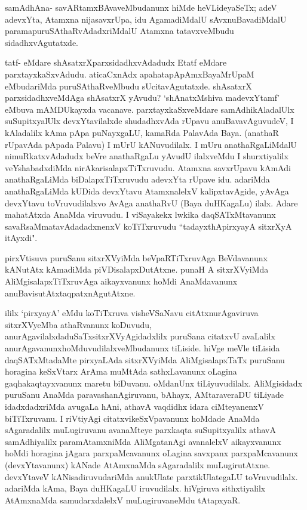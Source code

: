 \begin{artha}
samAdhAna- savARtamxBAvaveMbudanunx hiMde heVLideyaSeTx; adeV adevxYta, Atamxna nijasavxrUpa, idu AgamadiMdalU sAvxnuBavadiMdalU paramapuruSAthaRvAdadxriMdalU Atamxna tatavxveMbudu sidadhxvAgutatxde. 
\end{artha}


\begin{artha}
tatf- eMdare shAsatxrXparxsidadhxvAdadudx Etatf eMdare parxtayxkaSxvAdudu. aticaCxnAdx apahatapApAmx\s BayaMrUpaM eMbudariMda puruSAthaRveMbudu sUcitavAgutatxde. shAsatxrX parxsidadhxveMdAga shAsatxrX yAvudu?  `shAnatxMshiva madevxYtamf' eMbuva mAMDUkayxda vacanave. parxtayxkaSxveMdare samAdhikAladalUlx suSupitxyalUlx devxYtavilalxde shudadhxvAda rUpavu anuBavavAguvudeV, I kAladalilx kAma pApa puNayxgaLU, kamaRda PalavAda Baya. (anathaR rUpavAda pApada Palavu) I mUrU kANuvudilalx. I mUru anathaRgaLiMdalU nimuRkatxvAdadudx beVre anathaRgaLu yAvudU ilalxveMdu I shurxtiyalilx veYshabadxdiMda nirAkarisalapxTiTxruvudu. Atamxna savxrUpavu kAmAdi anathaRgaLiMda biDalapxTiTxruvudu adevxYta rUpave idu. adariMda anathaRgaLiMda kUDida devxYtavu AtamxnalelxV kalipxtavAgide, yAvAga devxYtavu toVruvudilalxvo AvAga anathaRvU (Baya duHKagaLu) ilalx. Adare mahatAtxda AnaMda viruvudu. I viSayakekx lwkika daqSATxMtavanunx savaRsaMmatavAdadadxnenxV koTiTxruvudu ``tadayxthA\break pirxyayA sitxrXyA itAyxdi".
\end{artha}

\begin{artha}%
pirxVtisuva puruSanu sitxrXVyiMda beVpaRTiTxruvAga BeVdavanunx kANutAtx kAmadiMda piVDisalapxDutAtxne. punaH A sitxrXVyiMda AliMgisalapxTiTxruvAga aikayxvanunx hoMdi AnaMdavanunx anuBavisutAtx\break taqpatxnAgutAtxne. 
\end{artha}

\begin{artha}
ililx `pirxyayA' eMdu koTiTxruva visheVSaNavu citAtxnurAgaviruva sitxrXVyeMba athaRvanunx koDuvudu, anurAgavilalxda\break duSaTxsitxrXVyAgidadxlilx puruSana citatxvU avaLalilx anurAgavanunx\break hoMduvudilalxveMbudanunx tiLiside. hiVge meVle tiLisida daqSATxMtadaMte pirxyaLAda sitxrXVyiMda AliMgisalapxTaTx puruSanu horagina keSxVtarx ArAma muMtAda sathxLavanunx oLagina gaqhakaqtayxvanunx maretu biDuvanu. oMdanUnx tiLiyuvudilalx. AliMgisidadx puruSanu AnaMda paravashanAgiruvanu, bAhayx, AMtaraveraDU tiLiyade idadxdadxriMda avugaLa hAni, athavA vaqdidhx idara ciMteyanenxV biTiTxruvanu. I riVtiyAgi citatxvikeSxVpavanunx hoMdade AnaMda sAgaradalilx muLugiruvanu avanaMteye parxkaqta suSupitxyalilx athavA samAdhiyalilx paramAtamxniMda AliMgatanAgi avanalelxV aikayxvanunx hoMdi horagina jAgara parxpaMcavanunx oLagina savxpanx parxpaMcavanunx (devxYtavanunx) kANade AtAmxnaMda sAgaradalilx muLugirutAtxne. devxYtaveV kANisadiruvudariMda anukUlate parxtikUlategaLU toVruvudilalx. adariMda kAma, Baya duHKagaLU iruvudilalx. hiVgiruva sithxtiyalilx AtAmxnaMda samudarxdalelxV muLugiruvaneMdu tAtapxyaR.
\end{artha}

